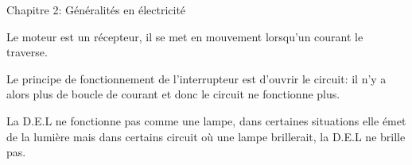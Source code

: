 \documentclass[24pt]{article}
\newcommand{\titre}{Chapitre 2: Généralités en électricité} %
\begin{document}
\thispagestyle{fancy}
\cfoot{}

\begin{titlebox}{\titre}
    \setlength\parindent{4pt} %
    \setlength\parskip{5pt} 

    
    Le moteur est un récepteur, il se met en mouvement lorsqu'un courant le traverse.
    
    Le principe de fonctionnement de 
    l'interrupteur est d'ouvrir le circuit: il n'y a alors plus de 
    boucle de courant et donc le circuit ne fonctionne plus.
    
    La D.E.L ne fonctionne pas comme une lampe, dans certaines situations 
    elle émet de la lumière mais dans certains circuit où une lampe brillerait, la D.E.L ne brille pas. 
     

\end{titlebox}
\end{document}
